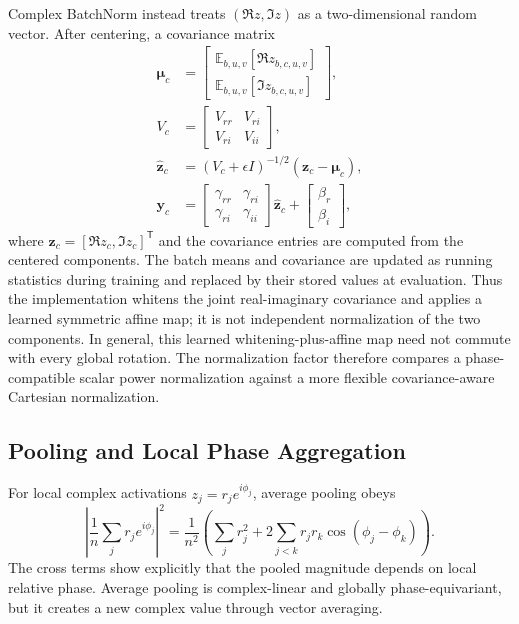Complex BatchNorm instead treats $(\Re z,\Im z)$ as a two-dimensional random vector. After centering, a covariance matrix
\begin{align}
\boldsymbol{\mu}_c&=
\begin{bmatrix}\mathbb{E}_{b,u,v}[\Re z_{b,c,u,v}]\\
\mathbb{E}_{b,u,v}[\Im z_{b,c,u,v}]\end{bmatrix},\\
V_c&=\begin{bmatrix}V_{rr}&V_{ri}\\V_{ri}&V_{ii}\end{bmatrix},\\
\widehat{\mathbf z}_c&=(V_c+\epsilon I)^{-1/2}(\mathbf z_c-\boldsymbol{\mu}_c),\\
\mathbf y_c&=
\begin{bmatrix}\gamma_{rr}&\gamma_{ri}\\\gamma_{ri}&\gamma_{ii}\end{bmatrix}
\widehat{\mathbf z}_c+
\begin{bmatrix}\beta_r\\\beta_i\end{bmatrix},
\end{align}
where $\mathbf z_c=[\Re z_c,\Im z_c]^\mathsf{T}$ and the covariance entries are computed from the centered components. The batch means and covariance are updated as running statistics during training and replaced by their stored values at evaluation. Thus the implementation whitens the joint real-imaginary covariance and applies a learned symmetric affine map; it is not independent normalization of the two components. In general, this learned whitening-plus-affine map need not commute with every global rotation. The normalization factor therefore compares a phase-compatible scalar power normalization against a more flexible covariance-aware Cartesian normalization.

\subsection{Pooling and Local Phase Aggregation}
For local complex activations $z_j=r_je^{i\phi_j}$, average pooling obeys
\begin{equation}
\left|\frac{1}{n}\sum_jr_je^{i\phi_j}\right|^2
=\frac{1}{n^2}\left(\sum_jr_j^2+2\sum_{j<k}r_jr_k\cos(\phi_j-\phi_k)\right).
\label{eq:complex-average-coherence}
\end{equation}
The cross terms show explicitly that the pooled magnitude depends on local relative phase. Average pooling is complex-linear and globally phase-equivariant, but it creates a new complex value through vector averaging.

